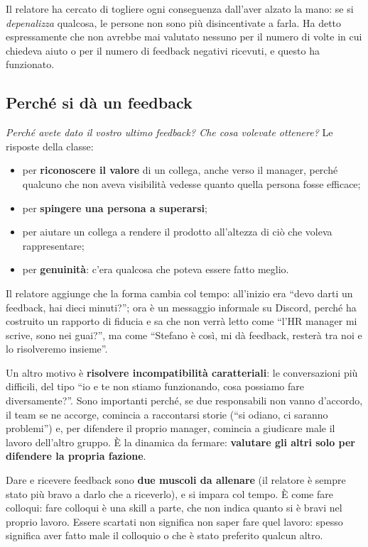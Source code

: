 Il relatore ha cercato di togliere ogni conseguenza dall'aver alzato la mano:
se si \emph{depenalizza} qualcosa, le persone non sono più disincentivate a
farla. Ha detto espressamente che non avrebbe mai valutato nessuno per il
numero di volte in cui chiedeva aiuto o per il numero di feedback negativi
ricevuti, e questo ha funzionato.

\subsection{Perché si dà un feedback}

\emph{Perché avete dato il vostro ultimo feedback? Che cosa volevate ottenere?}
Le risposte della classe:
\begin{itemize}
  \item per \textbf{riconoscere il valore} di un collega, anche verso il
        manager, perché qualcuno che non aveva visibilità vedesse quanto
        quella persona fosse efficace;
  \item per \textbf{spingere una persona a superarsi};
  \item per aiutare un collega a rendere il prodotto all'altezza di ciò che
        voleva rappresentare;
  \item per \textbf{genuinità}: c'era qualcosa che poteva essere fatto meglio.
\end{itemize}
Il relatore aggiunge che la forma cambia col tempo: all'inizio era ``devo
darti un feedback, hai dieci minuti?''; ora è un messaggio informale su
Discord, perché ha costruito un rapporto di fiducia e sa che non verrà letto
come ``l'HR manager mi scrive, sono nei guai?'', ma come ``Stefano è così, mi
dà feedback, resterà tra noi e lo risolveremo insieme''.

Un altro motivo è \textbf{risolvere incompatibilità caratteriali}: le
conversazioni più difficili, del tipo ``io e te non stiamo funzionando, cosa
possiamo fare diversamente?''. Sono importanti perché, se due responsabili non
vanno d'accordo, il team se ne accorge, comincia a raccontarsi storie (``si
odiano, ci saranno problemi'') e, per difendere il proprio manager, comincia a
giudicare male il lavoro dell'altro gruppo. È la dinamica da fermare:
\textbf{valutare gli altri solo per difendere la propria fazione}.

Dare e ricevere feedback sono \textbf{due muscoli da allenare} (il relatore è
sempre stato più bravo a darlo che a riceverlo), e si impara col tempo. È come
fare colloqui: fare colloqui è una skill a parte, che non indica quanto si è
bravi nel proprio lavoro. Essere scartati non significa non saper fare quel
lavoro: spesso significa aver fatto male il colloquio o che è stato preferito
qualcun altro.

